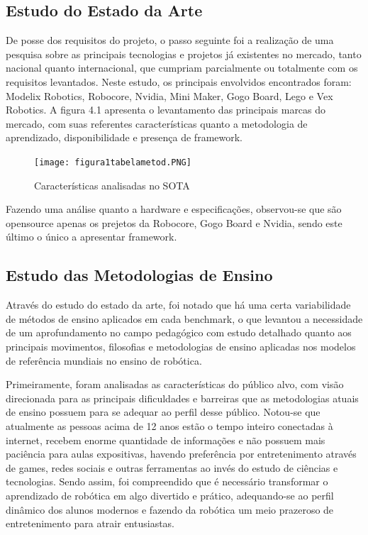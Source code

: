 \subsection{Estudo do Estado da Arte}
De posse dos requisitos do projeto, o passo seguinte foi a realização de uma pesquisa sobre as principais tecnologias e projetos já existentes no mercado, tanto nacional quanto internacional, que cumpriam parcialmente ou totalmente com os requisitos levantados. Neste estudo, os principais envolvidos encontrados foram: Modelix Robotics, Robocore, Nvidia, Mini Maker, Gogo Board, Lego e Vex Robotics.
A figura 4.1 apresenta o levantamento das principais marcas do mercado, com suas referentes características quanto a metodologia de aprendizado, disponibilidade e presença de framework.

\begin{figure}[h!]					
	\centering
	\caption{Características analisadas no SOTA}					
	\texttt{[image: figura1tabelametod.PNG]}					
	\label{img:sotabru}	
\end{figure}

Fazendo uma análise quanto a hardware e especificações, observou-se que são opensource apenas os prejetos da Robocore, Gogo Board e Nvidia, sendo este último o único a apresentar framework.


\subsection{Estudo das Metodologias de Ensino}
	
Através do estudo do estado da arte, foi notado que há uma certa variabilidade de métodos de ensino aplicados em cada benchmark, o que levantou a necessidade de um aprofundamento no campo pedagógico com estudo detalhado quanto aos principais movimentos, filosofias e metodologias de ensino aplicadas nos modelos de referência mundiais no ensino de robótica. 

Primeiramente, foram analisadas as características do público alvo, com visão direcionada para as principais dificuldades e barreiras que as metodologias atuais de ensino possuem para se adequar ao perfil desse público. Notou-se que atualmente as pessoas acima de 12 anos estão o tempo inteiro conectadas à internet, recebem enorme quantidade de informações e não possuem mais paciência para aulas expositivas, havendo preferência por entretenimento através de games, redes sociais e outras ferramentas ao invés do estudo de ciências e tecnologias. Sendo assim, foi compreendido que é necessário transformar o aprendizado de robótica em algo divertido e prático, adequando-se ao perfil dinâmico dos alunos modernos e fazendo da robótica um meio prazeroso de entretenimento para atrair entusiastas.

